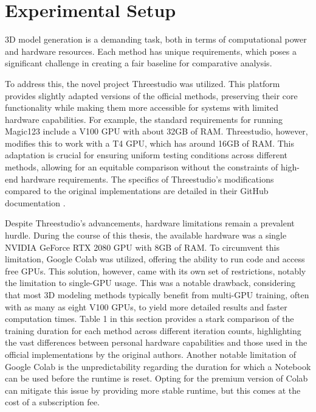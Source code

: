 \section{Experimental Setup}\label{Setup}

3D model generation is a demanding task, both in terms of computational power and hardware resources. Each method has unique requirements, which poses a significant challenge in creating a fair baseline for comparative analysis.

To address this, the novel project Threestudio \citep{threestudio2023} was utilized. This platform provides slightly adapted versions of the official methods, preserving their core functionality while making them more accessible for systems with limited hardware capabilities. For example, the standard requirements for running Magic123 \citep{qian2023magic123} include a V100 GPU with about 32GB of RAM\@. Threestudio, however, modifies this to work with a T4 GPU, which has around 16GB of RAM\@. This adaptation is crucial for ensuring uniform testing conditions across different methods, allowing for an equitable comparison without the constraints of high-end hardware requirements. The specifics of Threestudio's modifications compared to the original implementations are detailed in their GitHub documentation \citep{threestudio2023}.

Despite Threestudio's advancements, hardware limitations remain a prevalent hurdle. During the course of this thesis, the available hardware was a single NVIDIA GeForce RTX 2080 GPU with 8GB of RAM\@. To circumvent this limitation, Google Colab \citep{googlecolab} was utilized, offering the ability to run code and access free GPUs. This solution, however, came with its own set of restrictions, notably the limitation to single-GPU usage. This was a notable drawback, considering that most 3D modeling methods typically benefit from multi-GPU training, often with as many as eight V100 GPUs, to yield more detailed results and faster computation times. Table 1 in this section provides a stark comparison of the training duration for each method across different iteration counts, highlighting the vast differences between personal hardware capabilities and those used in the official implementations by the original authors. Another notable limitation of Google Colab is the unpredictability regarding the duration for which a Notebook can be used before the runtime is reset. Opting for the premium version of Colab can mitigate this issue by providing more stable runtime, but this comes at the cost of a subscription fee.

